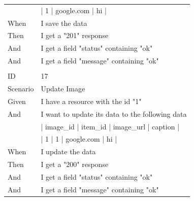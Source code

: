 \documentclass{report}
\begin{document}
\begin{tabular}{ l l }
      		& | 1       | google.com | hi      |\\
When 		& I save the data \\
Then 		& I get a "201" response \\
And 			& I get a field "status" containing "ok" \\
And 			& I get a field "message" containing "ok"\\ \\
ID 			& 17\\
Scenario		& Update Image\\
Given 		& I have a resource with the id "1" \\
And 			& I want to update its data to the following data \\
      		& | image\_id | item\_id | image\_url  | caption | \\
      		& | 1        | 1       | google.com | hi      | \\
When 		& I update the data\\
Then 		& I get a "200" response \\
And 			& I get a field "status" containing "ok" \\
And 			& I get a field "message" containing "ok" \\
\end{tabular}
\newpage
\end{document}

